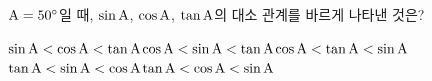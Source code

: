 $\mathrm{A}=50^\circ$일 때, $\sin\mathrm{A}$, $\cos\mathrm{A}$, $\tan\mathrm{A}$의 대소 관계를 바르게 나타낸 것은?
\begin{choicesv}{$\sin\mathrm{A}<\cos\mathrm{A}<\tan\mathrm{A}$}{$\cos\mathrm{A}<\sin\mathrm{A}<\tan\mathrm{A}$}{$\cos\mathrm{A}<\tan\mathrm{A}<\sin\mathrm{A}$}{$\tan\mathrm{A}<\sin\mathrm{A}<\cos\mathrm{A}$}{$\tan\mathrm{A}<\cos\mathrm{A}<\sin\mathrm{A}$}\end{choicesv}
